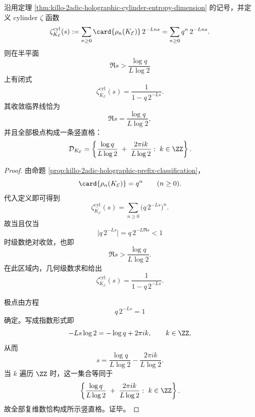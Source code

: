 \begin{theorem}\label{thm:killo-2adic-holographic-cylinder-zeta-complex-dimensions}
沿用定理 \ref{thm:killo-2adic-holographic-cylinder-entropy-dimension} 的记号，并定义 cylinder \(\zeta\) 函数
\[
\zeta_{K_{\mathcal E}}^{\mathrm{cyl}}(s)
:=
\sum_{n\ge 0}\card{\rho_n(K_{\mathcal E})}\,2^{-Lns}
=
\sum_{n\ge 0}q^n\,2^{-Lns}.
\]
则在半平面
\[
\Re s>\frac{\log q}{L\log 2}
\]
上有闭式
\[
\zeta_{K_{\mathcal E}}^{\mathrm{cyl}}(s)=\frac{1}{1-q\,2^{-Ls}}.
\]
其收敛临界线恰为
\[
\Re s=\frac{\log q}{L\log 2},
\]
并且全部极点构成一条竖直格：
\[
\mathcal D_{K_{\mathcal E}}
=
\left\{
\frac{\log q}{L\log 2}
\;+\;
\frac{2\pi i k}{L\log 2}:\ k\in\ZZ
\right\}.
\]
\end{theorem}
\begin{proof}
由命题 \ref{prop:killo-2adic-holographic-prefix-classification}，
\[
\card{\rho_n(K_{\mathcal E})}=q^n
\qquad(n\ge 0).
\]
代入定义即可得到
\[
\zeta_{K_{\mathcal E}}^{\mathrm{cyl}}(s)
=
\sum_{n\ge 0}\bigl(q\,2^{-Ls}\bigr)^n.
\]
故当且仅当
\[
\bigl|q\,2^{-Ls}\bigr|=q\,2^{-L\Re s}<1
\]
时级数绝对收敛，也即
\[
\Re s>\frac{\log q}{L\log 2}.
\]
在此区域内，几何级数求和给出
\[
\zeta_{K_{\mathcal E}}^{\mathrm{cyl}}(s)=\frac{1}{1-q\,2^{-Ls}}.
\]

极点由方程
\[
q\,2^{-Ls}=1
\]
确定。写成指数形式即
\[
-Ls\log 2=-\log q+2\pi i k,
\qquad k\in\ZZ,
\]
从而
\[
s=\frac{\log q}{L\log 2}-\frac{2\pi i k}{L\log 2}.
\]
当 \(k\) 遍历 \(\ZZ\) 时，这一集合等同于
\[
\left\{
\frac{\log q}{L\log 2}
\;+\;
\frac{2\pi i k}{L\log 2}:\ k\in\ZZ
\right\}.
\]
故全部复维数恰构成所示竖直格。证毕。
\end{proof}

